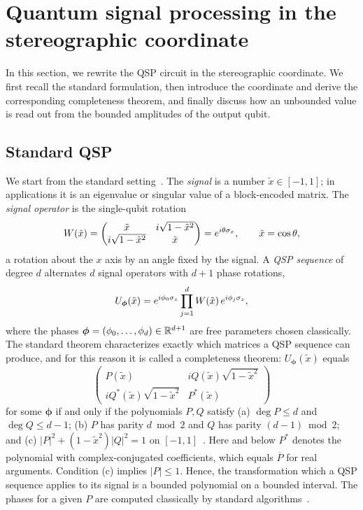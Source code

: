 \section{Quantum signal processing in the stereographic coordinate}
\label{sec:projective}

In this section, we rewrite the QSP circuit in the stereographic
coordinate.  We first recall the standard formulation, then
introduce the coordinate and derive the corresponding completeness
theorem, and finally discuss how an unbounded value is read out
from the bounded amplitudes of the output qubit.

\subsection{Standard QSP}
\label{subsec:standard}

We start from the standard setting~\cite{GSLW2019}.  The
\emph{signal} is a number $\tilde x\in[-1,1]$; in applications it
is an eigenvalue or singular value of a block-encoded matrix.  The
\emph{signal operator} is the single-qubit rotation
\begin{equation}
	W(\tilde x)=\begin{pmatrix}\tilde x & i\sqrt{1-\tilde x^2}\\
		i\sqrt{1-\tilde x^2} & \tilde x\end{pmatrix}
	=e^{i\theta\sigma_x},\qquad \tilde x=\cos\theta,
	\label{eq:W}
\end{equation}
a rotation about the $x$ axis by an angle fixed by the signal.  A
\emph{QSP sequence} of degree $d$ alternates $d$ signal operators
with $d+1$ phase rotations,
\begin{equation}
	U_{\bm\phi}(\tilde x)=e^{i\phi_0\sigma_z}\prod_{j=1}^{d}
	W(\tilde x)\,e^{i\phi_j\sigma_z},
	\label{eq:std-seq}
\end{equation}
where the phases $\bm\phi=(\phi_0,\dots,\phi_d)\in\mathbb{R}^{d+1}$ are
free parameters chosen classically.  The standard theorem
characterizes exactly which matrices a QSP sequence can produce,
and for this reason it is called a completeness theorem:
$U_{\bm\phi}(\tilde x)$ equals
\begin{equation}
	\begin{pmatrix} P(\tilde x) & iQ(\tilde x)\sqrt{1-\tilde x^2}\\
		iQ^*(\tilde x)\sqrt{1-\tilde x^2} & P^*(\tilde x)\end{pmatrix}
	\label{eq:std-form}
\end{equation}
for some $\bm\phi$ if and only if the polynomials $P,Q$ satisfy
(a) $\deg P\le d$ and $\deg Q\le d-1$; (b) $P$ has parity
$d\bmod 2$ and $Q$ has parity $(d-1)\bmod 2$; and (c)
$|P|^2+(1-\tilde x^2)|Q|^2=1$ on
$[-1,1]$~\cite[Thm.~3]{GSLW2019}.  Here and below $P^*$ denotes the
polynomial with complex-conjugated coefficients, which equals
$\overline{P}$ for real arguments.  Condition (c) implies
$|P|\le 1$.  Hence, the transformation which a QSP sequence applies
to its signal is a bounded polynomial on a bounded interval.  The phases
for a given $P$ are computed classically by standard
algorithms~\cite{DongMengWhaleyEtAl2021,BerntsonSunderhauf2024,NiSarkarYingLin2025}.


